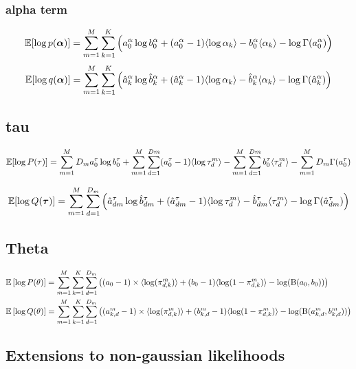 \documentclass[10pt, a4paper,openany]{report}
\begin{document}
\subsubsection*{alpha term}
\[
\mathbb{E} [\log p(\mbox{\boldmath $\alpha$})] = \sum_{m=1}^{M}\sum_{k=1}^{K}\Big(a_0^\alpha\log b_0^\alpha +   (a_0^\alpha - 1) \langle \log \alpha_k \rangle - b_0^\alpha \langle \alpha_k \rangle - \log \Gamma(a_0^\alpha) \Big)
\]
\[
\mathbb{E} [\log q(\mbox{\boldmath $\alpha$})] = \sum_{m=1}^{M}\sum_{k=1}^{K} \Big( \hat{a}_{k}^\alpha \log \hat{b}_{k}^\alpha + (\hat{a}_{k}^\alpha - 1) \langle \log \alpha_k \rangle - \hat{b}_{k}^\alpha \langle \alpha_k \rangle - \log \Gamma(\hat{a}_{k}^\alpha) \Big)
\]

\subsection*{tau}
\[
\mathbb{E} [\log P(\tau)] = \sum_{m=1}^{M} D_m a_0^\tau \log b_0^\tau + \sum_{m=1}^{M}\sum_{d=1}^{Dm} (a_0^\tau - 1) \langle \log \tau_d^m \rangle - \sum_{m=1}^{M}\sum_{d=1}^{Dm} b_0^\tau \langle \tau_d^m \rangle - \sum_{m=1}^{M} D_m \Gamma(a_0^\tau)
\]

\[
\mathbb{E} [\log Q(\mbox{\boldmath $\tau$})] = \sum_{m=1}^{M}\sum_{d=1}^{D_m} \Big( \hat{a}_{dm}^\tau \log \hat{b}_{dm}^\tau + (\hat{a}_{dm}^\tau - 1) \langle \log \tau_d^m \rangle - \hat{b}_{dm}^\tau \langle \tau_d^m \rangle - \log \Gamma(\hat{a}_{dm}^\tau) \Big)
\]

\subsection*{Theta}
\begin{equation*}
\begin{aligned}
&\mathbb{E}\left[ \log P(\theta) \right] = \sum_{m=1}^M \sum_{k=1}^K\sum_{d=1}^{D_m}\left( (a_0 - 1) \times \langle \log(\pi^m_{d, k}) \rangle + (b_0 -1) \langle \log(1 - \pi^m_{d, k}) \rangle - \log (\mathrm{B} (a_0, b_0))\right) \\
&\mathbb{E}\left[ \log Q(\theta) \right] = \sum_{m=1}^M \sum_{k=1}^K\sum_{d=1}^{D_m}\left( (a^m_{k,d} - 1) \times \langle \log(\pi^m_{d, k}) \rangle + (b^m_{k,d} -1) \langle \log(1 - \pi^m_{d, k}) \rangle - \log (\mathrm{B} (a^m_{k,d}, b^m_{k,d})) \right) \\
\end{aligned}
\end{equation*}

\subsection{Extensions to non-gaussian likelihoods}
\end{document}
